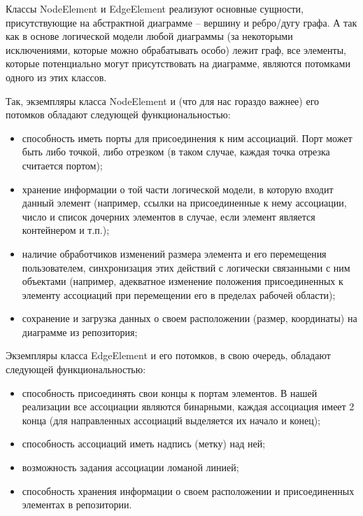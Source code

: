 \documentclass[a4paper]{article}
\newcommand\liststyleWWviiiNumii{%
\renewcommand\theenumi{\arabic{enumi}}
\renewcommand\theenumii{\arabic{enumii}}
\renewcommand\theenumiii{\arabic{enumiii}}
\renewcommand\labelitemi{[F0B7?]}
\renewcommand\labelenumi{\theenumi.}
\renewcommand\labelenumii{\theenumii.}
\renewcommand\labelenumiii{\theenumiii.}
}
\newcommand\liststyleWWviiiNumxv{%
\renewcommand\theenumi{\arabic{enumi}}
\renewcommand\theenumii{\arabic{enumii}}
\renewcommand\theenumiii{\arabic{enumiii}}
\renewcommand\labelitemi{[F0B7?]}
\renewcommand\labelenumi{\theenumi.}
\renewcommand\labelenumii{\theenumii.}
\renewcommand\labelenumiii{\theenumiii.}
}
\begin{document}
{
Классы \foreignlanguage{english}{NodeElement} и
\foreignlanguage{english}{EdgeElement} реализуют основные сущности,
присутствующие на абстрактной диаграмме – вершину и ребро/дугу графа. А
так как в основе логической модели любой диаграммы (за некоторыми
исключениями, которые можно обрабатывать особо) лежит граф, все
элементы, которые потенциально могут присутствовать на диаграмме,
являются потомками одного из этих классов. }

{
Так, экземпляры класса \foreignlanguage{english}{NodeElement} и (что для
нас гораздо важнее) его потомков обладают следующей функциональностью:}

\liststyleWWviiiNumii
\begin{itemize}
\item {
способность иметь порты для присоединения к ним ассоциаций. Порт может
быть либо точкой, либо отрезком (в таком случае, каждая точка отрезка
считается портом);}
\item {
хранение информации о той части логической модели, в которую входит
данный элемент (например, ссылки на присоединенные к нему ассоциации,
число и список дочерних элементов в случае, если элемент является
контейнером и т.п.);}
\item {
наличие обработчиков изменений размера элемента и его перемещения
пользователем, синхронизация этих действий с логически связанными с ним
объектами (например, адекватное изменение положения присоединенных к
элементу ассоциаций при перемещении его в пределах рабочей области);}
\item {
сохранение и загрузка данных о своем расположении (размер, координаты)
на диаграмме из репозитория;}
\end{itemize}
{
Экземпляры класса \foreignlanguage{english}{EdgeElement} и его потомков,
в свою очередь, обладают следующей функциональностью:}

\liststyleWWviiiNumxv
\begin{itemize}
\item {
способность присоединять свои концы к портам элементов. В нашей
реализации все ассоциации являются бинарными, каждая ассоциация имеет 2
конца (для направленных ассоциаций выделяется их начало и конец);}
\item {
способность ассоциаций иметь надпись (метку) над ней;}
\item {
возможность задания ассоциации ломаной линией;}
\item {
способность хранения информации о своем расположении и присоединенных
элементах в репозитории.}
\end{itemize}
\end{document}
